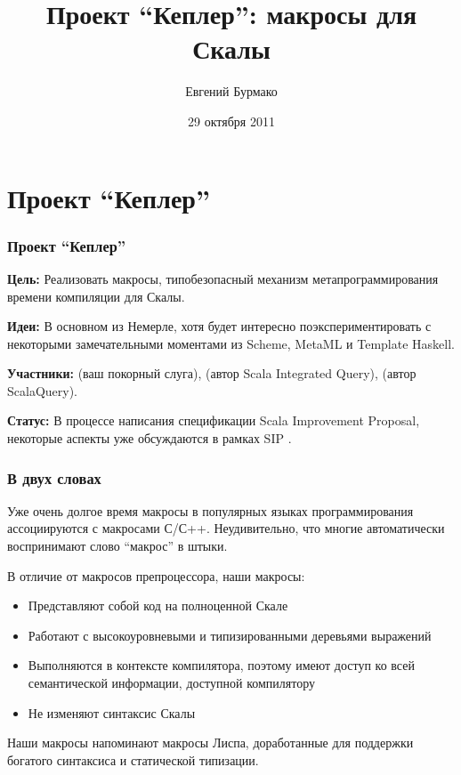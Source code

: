 \documentclass{beamer}
\title{Проект ``Кеплер'': макросы для Скалы}
\author{Евгений Бурмако}
\institute{EPFL, LAMP}
\date{29 октября 2011}
\begin{document}
\maketitle

\section{Проект ``Кеплер''}

\begin{frame}[t]
\frametitle{Проект ``Кеплер''}

\textbf{Цель:} Реализовать макросы, типобезопасный механизм метапрограммирования времени компиляции для Скалы.

\textbf{Идеи:} В основном из Немерле, хотя будет интересно поэкспериментировать с некоторыми замечательными моментами из Scheme, MetaML и Template Haskell.

\textbf{Участники:}  (ваш покорный слуга),  (автор Scala Integrated Query),  (автор ScalaQuery).

\textbf{Статус:} В процессе написания спецификации Scala Improvement Proposal, некоторые аспекты уже обсуждаются в рамках SIP .
\end{frame}

\begin{frame}[t]
\frametitle{В двух словах}

Уже очень долгое время макросы в популярных языках программирования ассоциируются с макросами С/С++. Неудивительно, что многие автоматически воспринимают слово ``макрос'' в штыки.

В отличие от макросов препроцессора, наши макросы:
\begin{itemize}
\item Представляют собой код на полноценной Скале
\item Работают с высокоуровневыми и типизированными деревьями выражений
\item Выполняются в контексте компилятора, поэтому имеют доступ ко всей семантической информации, доступной компилятору
\item Не изменяют синтаксис Скалы
\end{itemize}

Наши макросы напоминают макросы Лиспа, доработанные для поддержки богатого синтаксиса и статической типизации.
\end{frame}
\end{document}
